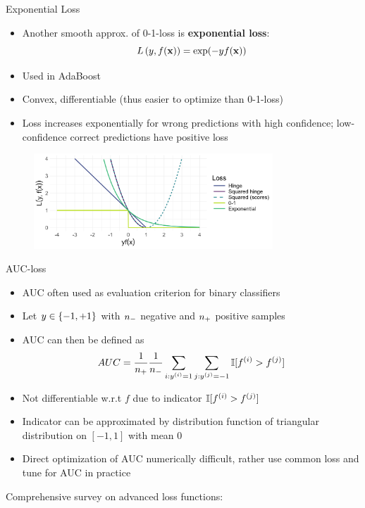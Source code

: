 \documentclass[11pt,compress,t,notes=noshow, xcolor=table]{beamer}
\begin{document}
\begin{vbframe}{Exponential Loss}


\begin{itemize}
\item Another smooth 
approx. of 0-1-loss is \textbf{exponential loss}:
$$\Lxy = \exp(-y\fx)$$ 
\item Used in AdaBoost
\item Convex, differentiable (thus easier to optimize than 0-1-loss)
\item Loss increases exponentially for wrong predictions with high confidence; low-confidence correct predictions have positive loss
\end{itemize}


\begin{figure}
\includegraphics[width = 0.8\textwidth]{figure/overview_classif_all.png}
\end{figure}

\end{vbframe}

\begin{vbframe}{AUC-loss}

\begin{itemize}
\item AUC often used as evaluation criterion for binary classifiers
\item Let $y \in \setmp$ with $\nn$ negative and $\np$ positive samples %
\item AUC can then be defined as
$$AUC = \frac{1}{\np} \frac{1}{\nn} \sum_{i: \yi = 1} \sum_{j: \yi[j] = -1} \I [f^{(i)} > f^{(j)}]$$
\item Not differentiable w.r.t $f$ due to indicator $\I [f^{(i)} > f^{(j)}]$
\item Indicator can be approximated by distribution function of triangular distribution on $[-1, 1]$ with mean $0$
\item Direct optimization of AUC numerically difficult, rather use common loss and tune for AUC in practice

\end{itemize}
\lz
Comprehensive survey on advanced loss functions: 

\end{vbframe}





\endlecture
\end{document}
